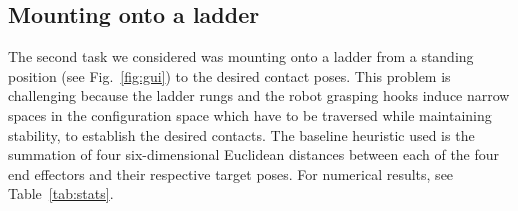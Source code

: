 \documentclass{article}
\begin{document}
\subsection{Mounting onto a ladder}
The second task we considered was mounting onto a ladder from a standing position (see Fig.~\ref{fig:gui}) to the desired contact poses. This problem is challenging because the ladder rungs and the robot grasping hooks induce narrow spaces in the configuration space which have to be traversed while maintaining stability, to establish the desired contacts. The baseline heuristic  used is the summation of four six-dimensional Euclidean distances between each of the four end effectors and their respective target poses. 
For numerical results, see Table~\ref{tab:stats}.




 
\end{document}
